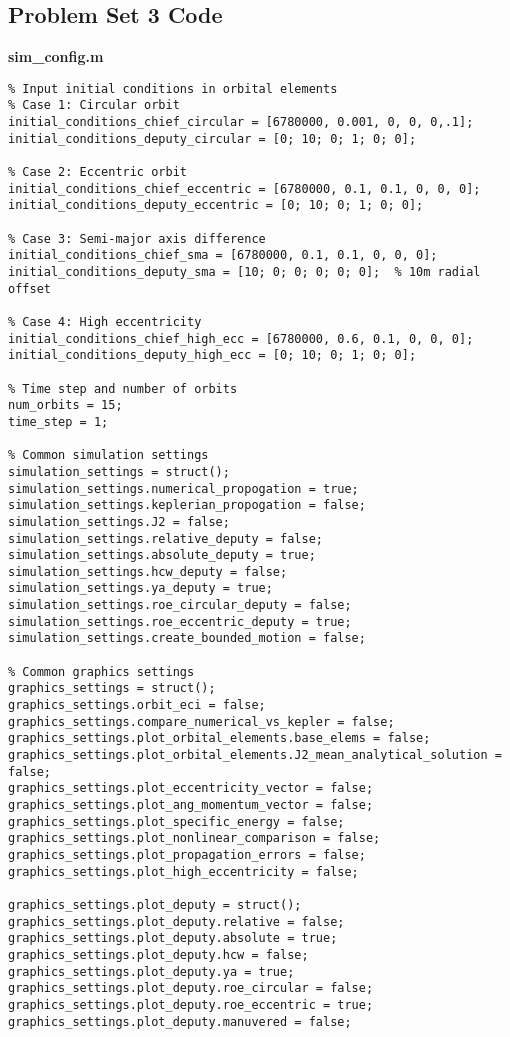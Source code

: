 \subsection{Problem Set 3 Code}

\textbf{sim\_config.m}
\begin{lstlisting}
% Input initial conditions in orbital elements
% Case 1: Circular orbit
initial_conditions_chief_circular = [6780000, 0.001, 0, 0, 0,.1]; 
initial_conditions_deputy_circular = [0; 10; 0; 1; 0; 0];

% Case 2: Eccentric orbit
initial_conditions_chief_eccentric = [6780000, 0.1, 0.1, 0, 0, 0]; 
initial_conditions_deputy_eccentric = [0; 10; 0; 1; 0; 0];

% Case 3: Semi-major axis difference
initial_conditions_chief_sma = [6780000, 0.1, 0.1, 0, 0, 0]; 
initial_conditions_deputy_sma = [10; 0; 0; 0; 0; 0];  % 10m radial offset

% Case 4: High eccentricity
initial_conditions_chief_high_ecc = [6780000, 0.6, 0.1, 0, 0, 0]; 
initial_conditions_deputy_high_ecc = [0; 10; 0; 1; 0; 0];

% Time step and number of orbits
num_orbits = 15;
time_step = 1;

% Common simulation settings
simulation_settings = struct();
simulation_settings.numerical_propogation = true;
simulation_settings.keplerian_propogation = false;
simulation_settings.J2 = false;
simulation_settings.relative_deputy = false;
simulation_settings.absolute_deputy = true;
simulation_settings.hcw_deputy = false;
simulation_settings.ya_deputy = true;
simulation_settings.roe_circular_deputy = false;
simulation_settings.roe_eccentric_deputy = true;
simulation_settings.create_bounded_motion = false;

% Common graphics settings
graphics_settings = struct();
graphics_settings.orbit_eci = false;
graphics_settings.compare_numerical_vs_kepler = false;
graphics_settings.plot_orbital_elements.base_elems = false;
graphics_settings.plot_orbital_elements.J2_mean_analytical_solution = false;
graphics_settings.plot_eccentricity_vector = false;
graphics_settings.plot_ang_momentum_vector = false;
graphics_settings.plot_specific_energy = false;
graphics_settings.plot_nonlinear_comparison = false;
graphics_settings.plot_propagation_errors = false;
graphics_settings.plot_high_eccentricity = false;

graphics_settings.plot_deputy = struct();
graphics_settings.plot_deputy.relative = false;
graphics_settings.plot_deputy.absolute = true;
graphics_settings.plot_deputy.hcw = false;
graphics_settings.plot_deputy.ya = true;
graphics_settings.plot_deputy.roe_circular = false;
graphics_settings.plot_deputy.roe_eccentric = true;
graphics_settings.plot_deputy.manuvered = false;


\end{lstlisting}
